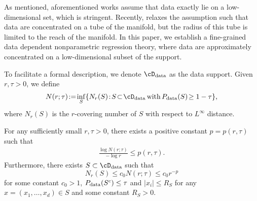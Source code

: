 As mentioned, aforementioned works assume that data exactly lie on a low-dimensional set, which is stringent. Recently, \citet{cloninger2020relu} relaxes the assumption such that data are concentrated on a tube of the manifold, but the radius of this tube is limited to the reach \citep{federer1959curvature} of the manifold. 
In this paper, we establish a fine-grained data dependent nonparametric regression theory, where data are approximately concentrated on a low-dimensional subset of the support.


To facilitate a formal description, we denote $\cD_{\rm data}$ as the data support. Given $r, \tau > 0$, we define
\begin{align*}
N(r; \tau)\! :=\! \inf_{S} \{N_r(S)\!:\! S\! \subset \! \cD_{\rm data}\! ~\text{with}~\! P_{\rm data}(S)\! \geq 1 - \tau\},
\end{align*}
where $N_r(S)$ is the $r$-covering number of $S$ with respect to $L^\infty$ distance.
\begin{assumption}\label{assumption:pdata_cover}
For any sufficiently small $r, \tau > 0$, there exists a positive constant $p=p(r,\tau)$ such that  
\begin{align*}
\frac{\log N(r; \tau)}{-\log r} \leq p(r,\tau).
\end{align*}
Furthermore,  there exists $S \subset \cD_{\rm data}$ such that $$N_r(S) \leq c_0 N(r;\tau) \leq c_0 r^{-p}$$ for some constant $c_0>1$, $P_{\rm data}(S^c) \leq \tau$ and $| x_i| \leq R_S$ for any $x=(x_1,\ldots,x_d)\in S$ and some constant $R_S>0.$
\end{assumption}

